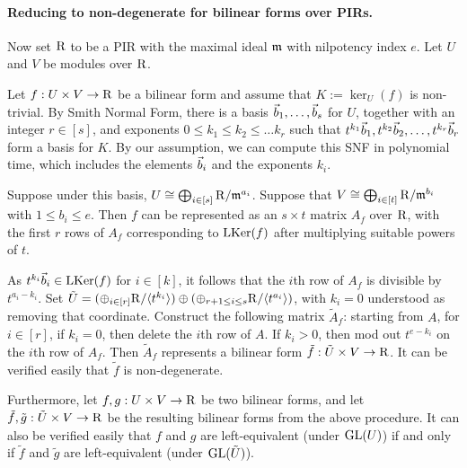 \paragraph{Reducing to non-degenerate for bilinear forms over PIRs.}
Now set $\mathrm{R}$ to be a PIR with the maximal ideal $\mathfrak{m}$ with nilpotency index $e$. Let $U$ and $V$ be modules over $\mathrm{R}$. 


Let $f:U\times V\to \mathrm{R}$ be a bilinear form and assume that $K:=\ker_U(f)$ is non-trivial. 
By Smith Normal Form, there is a basis $\vec{b}_1,\dotsc,\vec{b}_s$ for $U$, together with an integer $r\in[s]$, and exponents $0 \leq k_1 \leq k_2 \leq \dots k_r$  such that $t^{k_1} \vec{b}_1, t^{k_2} \vec{b}_2, \dotsc, t^{k_r} \vec{b}_r$ form a basis for $K$. By our assumption, we can compute this SNF in polynomial time, which includes the elements $\vec{b}_i$ and the exponents $k_i$.

Suppose under this basis, $U\cong \bigoplus_{i\in[s]} \mathrm{R}/\mathfrak{m}^{a_i}$. Suppose that $V\cong \bigoplus_{i\in[t]} \mathrm{R}/\mathfrak{m}^{b_i}$ with $1\leq b_i\leq e$. Then $f$ can be represented as an $s\times t$ matrix $A_f$ over $\mathrm{R}$, with the first $r$ rows of $A_f$ corresponding to $\mathrm{LKer}(f)$ after multiplying suitable powers of $t$. 

As $t^{k_i}\vec{b}_i\in \mathrm{LKer}(f)$ for $i\in[k]$, it follows that the $i$th row of $A_f$ is divisible by $t^{a_i-k_i}$. Set $\tilde U=(\oplus_{i\in[r]}\mathrm{R}/\langle t^{k_i}\rangle)\oplus (\oplus_{r+1\leq i\leq s}\mathrm{R}/\langle t^{a_i}\rangle)$, with $k_i=0$ understood as removing that coordinate. Construct the following matrix $\tilde A_f$: starting from $A$, for $i\in[r]$, if $k_i=0$, then delete the $i$th row of $A$. If $k_i>0$, then mod out $t^{e-k_i}$ on the $i$th row of $A_f$. Then $\tilde A_f$ represents a bilinear form $\tilde f:\tilde U\times V\to \mathrm{R}$. It can be verified easily that $\tilde f$ is non-degenerate. 

Furthermore, let $f, g:U\times V\to \mathrm{R}$ be two bilinear forms, and let $\tilde f, \tilde g:\tilde U\times V\to\mathrm{R}$ be the resulting bilinear forms from the above procedure. It can also be verified easily that $f$ and $g$ are left-equivalent (under $\mathrm{GL}(U)$) if and only if $\tilde f$ and $\tilde g$ are left-equivalent (under $\mathrm{GL}(\tilde U)$). %


